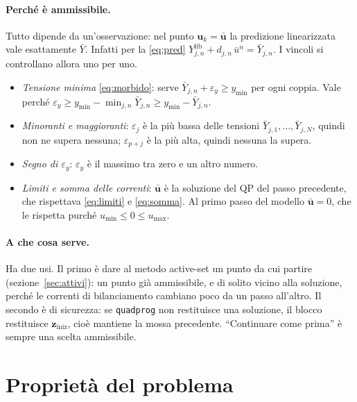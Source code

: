 \documentclass[11pt,a4paper]{article}
\newcommand{\file}[1]{\texttt{\detokenize{#1}}}
\newcommand{\vett}[1]{\boldsymbol{#1}}      %
\newcommand{\lib}{\mathrm{lib}}             %
\begin{document}
\paragraph{Perché è ammissibile.} Tutto dipende da un'osservazione: nel punto
$\vett{u}_k = \bar{\vett{u}}$ la predizione linearizzata vale esattamente $\bar Y$. Infatti per
la \eqref{eq:pred}
$Y^\lib_{j,n} + d_{j,n}\,\bar u^n = \bar Y_{j,n}$. I vincoli si controllano
allora uno per uno.
\begin{itemize}
  \item \emph{Tensione minima} \eqref{eq:morbido}: serve
        $\bar Y_{j,n} + \varepsilon_y \ge y_{\min}$ per ogni coppia. Vale perché
        $\varepsilon_y \ge y_{\min} - \min_{j,n} \bar Y_{j,n} \ge y_{\min} - \bar Y_{j,n}$.
  \item \emph{Minoranti e maggioranti}: $\varepsilon_j$ è la più bassa delle
        tensioni $\bar Y_{j,1}, \dots, \bar Y_{j,N}$, quindi non ne supera
        nessuna; $\varepsilon_{p+j}$ è la più alta, quindi nessuna la supera.
  \item \emph{Segno di $\varepsilon_y$}: $\varepsilon_y$ è il massimo tra zero e un altro numero.
  \item \emph{Limiti e somma delle correnti}: $\bar{\vett{u}}$ è la soluzione del QP
        del passo precedente, che rispettava \eqref{eq:limiti} e
        \eqref{eq:somma}. Al primo passo del modello $\bar{\vett{u}} = 0$, che le
        rispetta purché $u_{\min} \le 0 \le u_{\max}$.
\end{itemize}

\paragraph{A che cosa serve.} Ha due usi. Il primo è dare al metodo
active-set un punto da cui partire (sezione~\ref{sec:attivi}): un punto già
ammissibile, e di solito vicino alla soluzione, perché le correnti di
bilanciamento cambiano poco da un passo all'altro. Il secondo è di sicurezza:
se \texttt{quadprog} non restituisce una soluzione, il blocco
\file{Solutore_QP} restituisce $\vett{z}_{\mathrm{iniz}}$, cioè mantiene la mossa precedente.
``Continuare come prima'' è sempre una scelta ammissibile.

\section{Proprietà del problema}\label{sec:proprieta}
\end{document}
